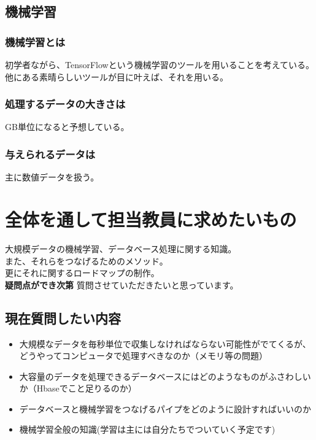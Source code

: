 \documentclass{scrartcl}
\begin{document}
\subsection{機械学習}
\label{sec:orgd3786a3}
\subsubsection{機械学習とは}
\label{sec:org8d82dd8}
初学者ながら、TensorFlowという機械学習のツールを用いることを考えている。他にある素晴らしいツールが目に叶えば、それを用いる。\\
\subsubsection{処理するデータの大きさは}
\label{sec:org9891fa7}
GB単位になると予想している。\\
\subsubsection{与えられるデータは}
\label{sec:orga0c36a7}
主に数値データを扱う。\\
\section{全体を通して担当教員に求めたいもの}
\label{sec:org0e8f71f}
 大規模データの機械学習、データベース処理に関する知識。\\
また、それらをつなげるためのメソッド。\\
更にそれに関するロードマップの制作。\\
 \textbf{疑問点ができ次第} 質問させていただきたいと思っています。\\
\subsection{現在質問したい内容}
\label{sec:org87cc282}
\begin{itemize}
\item 大規模なデータを毎秒単位で収集しなければならない可能性がでてくるが、どうやってコンピュータで処理すべきなのか（メモリ等の問題）\\
\item 大容量のデータを処理できるデータベースにはどのようなものがふさわしいか（Hbaseでこと足りるのか）\\
\item データベースと機械学習をつなげるパイプをどのように設計すればいいのか\\
\item 機械学習全般の知識(学習は主には自分たちでついていく予定です)\\
\end{itemize}
\end{document}
